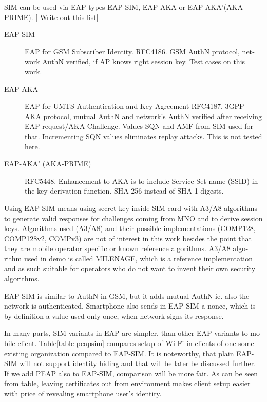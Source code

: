 \documentclass[12pt,a4paper,english]{tutthesis}
\begin{document}
\begin{otherlanguage}{english}
SIM can be used via EAP-types EAP-SIM\cite{rfc4186},
EAP-AKA\cite{rfc4187} or EAP-AKA'(AKA-PRIME)\cite{rfc5448}.  
[ Write out this list]
\begin{description}
\item[{EAP-SIM}] EAP for GSM Subscriber Identity. RFC4186. GSM AuthN
protocol, network AuthN verified, if AP knows right
session key. Test cases on this work.
\end{description}

\begin{description}
\item[{EAP-AKA}] EAP for UMTS Authentication and Key Agreement
RFC4187. 3GPP-AKA protocol, mutual AuthN and network's
AuthN verified after receiving
EAP-request/AKA-Challenge. Values SQN and AMF from SIM
used for that. Incrementing SQN values eliminates replay
attacks.  This is not tested here.
\item[{EAP-AKA' (AKA-PRIME)}] RFC5448. Enhancement to AKA is to include
Service Set name (SSID) in the key derivation function. SHA-256
instead of SHA-1 digests.
\end{description}



  Using EAP-SIM means using secret key inside SIM card with A3/A8
algorithms to generate valid responses for challenges coming from MNO
and to derive session keys.  Algorithms used (A3/A8) and their
possible implementations (COMP128, COMP128v2, COMPv3) are not of
interest in this work besides the point that they are mobile operator
specific or known reference algorithms.
A3/A8 algorithm used in demo is called MILENAGE, which is a reference 
implementation and as such suitable for  operators who do not 
want to invent their own security algorithms.


EAP-SIM is similar to AuthN in GSM, but it adds mutual AuthN ie. also the network is authenticated.
Smartphone also sends in EAP-SIM a nonce, which is by definition a
value used only once, when network signs its response. 


In many parts, SIM variants in EAP are simpler, than other EAP
variants to mobile client.  Table\ref{table-peapsim} compares setup of Wi-Fi
in clients of one some existing organization compared to EAP-SIM. It
is noteworthy, that plain EAP-SIM will not support identity hiding and
that will be later be discussed further. If we add PEAP\cite{peap}
also to EAP-SIM, comparison will be more fair.
As can be seen from table, leaving certificates out from environment
makes client setup easier with price of revealing smartphone user's
identity.  




\end{otherlanguage}
\end{document}
